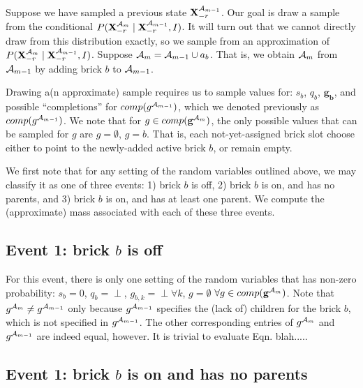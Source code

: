 \documentclass[11pt]{article}
\newcommand{\A}{{\cal A}}
\newcommand{\X}{\mathbf{X}}
\newcommand{\Am}{\A_{m}}
\newcommand{\gcomp}{comp(\mathbf{g}^{\Am})}
\begin{document}
Suppose we have sampled a previous state $\X^{\A_{m-1}}_{-r}$. Our goal is draw a sample from the conditional $P(\X^{\A_{m}}_{-r} \mid \X^{\A_{m-1}}_{-r}, I)$. It will turn out that we cannot directly draw from this distribution exactly, so we sample from an approximation of$P(\X^{\A_{m}}_{-r} \mid \X^{\A_{m-1}}_{-r}, I)$. Suppose $\A_{m} = \A_{m-1} \cup a_b$. That is, we obtain $\A_{m}$ from $\A_{m-1}$ by adding brick $b$ to $\A_{m-1}$.

Drawing a(n approximate) sample requires us to sample values for: $s_b$, $q_b$, $\mathbf{g_b}$, and possible ``completions'' for $comp(g^{\A_{m-1}})$, which we denoted previously as $comp(g^{\A_{m-1}})$. We note that for $g \in \gcomp$, the only possible values that can be sampled for $g$ are $g = \emptyset$, $g= b$. That is, each not-yet-assigned brick slot choose either to point to the newly-added active brick $b$, or remain empty.

We first note that for any setting of the random variables outlined above, we may classify it as one of three events: 1) brick $b$ is off, 2) brick $b$ is on, and has no parents, and 3) brick $b$ is on, and has at least one parent. We compute the (approximate) mass associated with each of these three events.

\subsection*{Event 1: brick $b$ is off}

For this event, there is only one setting of the random variables that has non-zero probability: $s_b = 0$, $q_b = \perp$, $g_{b,k} = \perp \forall k$, $g = \emptyset$ $\forall g \in \gcomp$. Note that $g^{\A_{m}} \neq g^{\A_{m-1}}$ only because $g^{\A_{m-1}}$ specifies the (lack of) children for the brick $b$, which is not specified in $g^{\A_{m-1}}$. The other corresponding entries of $g^{\A_{m}}$ and $g^{\A_{m-1}}$ are indeed equal, however. It is trivial to evaluate Eqn. blah.....

\subsection*{Event 1: brick $b$ is on and has no parents}






\end{document}
